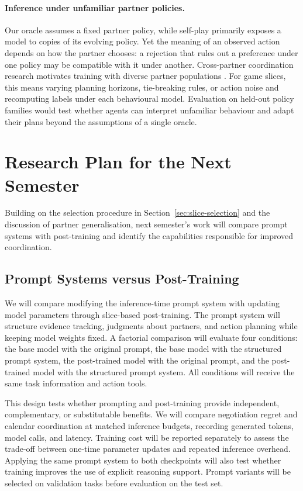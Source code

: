 \documentclass[11pt,a4paper]{article}
\begin{document}
\paragraph{Inference under unfamiliar partner policies.}
Our oracle assumes a fixed partner policy, while self-play primarily exposes
a model to copies of its evolving policy. Yet the meaning of an observed
action depends on how the partner chooses: a rejection that rules out a
preference under one policy may be compatible with it under another.
Cross-partner coordination research motivates training with diverse partner
populations \citep{hu2020otherplay,strouse2021collaborating}. For game slices,
this means varying planning horizons, tie-breaking rules, or action noise and
recomputing labels under each behavioural model. Evaluation on held-out
policy families would test whether agents can interpret unfamiliar behaviour
and adapt their plans beyond the assumptions of a single oracle.

\section{Research Plan for the Next Semester}
\label{sec:future-plan}
Building on the selection procedure in Section~\ref{sec:slice-selection}
and the discussion of partner generalisation, next semester's work will
compare prompt systems with post-training and identify the capabilities
responsible for improved coordination.

\subsection{Prompt Systems versus Post-Training}
We will compare modifying the inference-time prompt system with updating
model parameters through slice-based post-training. The prompt system will
structure evidence tracking, judgments about partners, and action planning
while keeping model weights fixed. A factorial comparison will evaluate
four conditions: the base model with the original prompt, the base model
with the structured prompt system, the post-trained model with the original
prompt, and the post-trained model with the structured prompt system.
All conditions will receive the same task information and action tools.

This design tests whether prompting and post-training provide independent,
complementary, or substitutable benefits. We will compare negotiation
regret and calendar coordination at matched inference budgets, recording
generated tokens, model calls, and latency. Training cost will be reported
separately to assess the trade-off between one-time parameter updates and
repeated inference overhead. Applying the same prompt system to both
checkpoints will also test whether training improves the use of explicit
reasoning support. Prompt variants will be selected on validation tasks
before evaluation on the test set.
\end{document}

